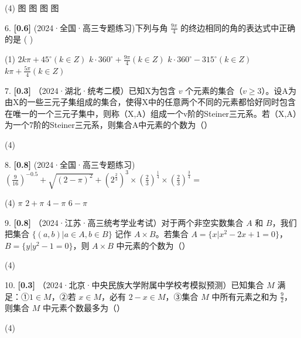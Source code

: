 \documentclass[11pt,a4paper]{article}
\begin{document}
\begin{tasks}(4)
    \task 图
    \task 图
    \task 图
    \task 图
\end{tasks}

\vspace{2.5cm}

6. \textbf{[0.6]} (2024·全国·高三专题练习)下列与角 $\frac{9\pi}{4}$ 的终边相同的角的表达式中正确的是 ( )

\begin{tasks}(1)
    \task $2k\pi + 45^\circ(k\in Z)$
    \task $k\cdot 360^\circ + \frac{9\pi}{4}(k\in Z)$
    \task $k\cdot 360^\circ - 315^\circ(k\in Z)$
    \task $k\pi + \frac{5\pi}{4}(k\in Z)$
\end{tasks}

\vspace{2.5cm}

7. \textbf{[0.3]} （2024·湖北·统考二模）已知X为包含 $v$ 个元素的集合（$v \geq 3$）。设A为由X的一些三元子集组成的集合，使得X中的任意两个不同的元素都恰好同时包含在唯一的一个三元子集中，则称（X,A）组成一个v阶的Steiner三元系。若（X,A）为一个7阶的Steiner三元系，则集合A中元素的个数为（\quad）

\begin{tasks}(4)
\end{tasks}

\vspace{2.5cm}

8. \textbf{[0.8]} (2024·全国·高三专题练习) $\left(\frac{9}{16}\right)^{-0.5}+\sqrt{(2-\pi)^{2}}+\left(2^{\frac{2}{3}}\right)^{3} \times\left(\frac{2}{3}\right)^{\frac{1}{4}} \times\left(\frac{2}{3}\right)^{\frac{3}{4}}=$

\begin{tasks}(4)
    \task $\pi$
    \task $2+\pi$
    \task $4-\pi$
    \task $6-\pi$
\end{tasks}

\vspace{2.5cm}

9. \textbf{[0.8]} （2024·江苏·高三统考学业考试）对于两个非空实数集合 $A$ 和 $B$，我们把集合 $\{(a,b)|a \in A, b \in B\}$ 记作 $A \times B$。若集合 $A=\{x|x^2-2x+1=0\}$，$B=\{y|y^2-1=0\}$，则 $A \times B$ 中元素的个数为（\quad）

\begin{tasks}(4)
\end{tasks}

\vspace{2.5cm}

10. \textbf{[0.3]} （2024·北京·中央民族大学附属中学校考模拟预测）已知集合 $M$ 满足：①$1 \in M$，②若 $x \in M$，必有 $2-x \in M$，③集合 $M$ 中所有元素之和为 $\frac{9}{2}$，则集合 $M$ 中元素个数最多为（\quad）

\begin{tasks}(4)
\end{tasks}

\vspace{2.5cm}
\end{document}
